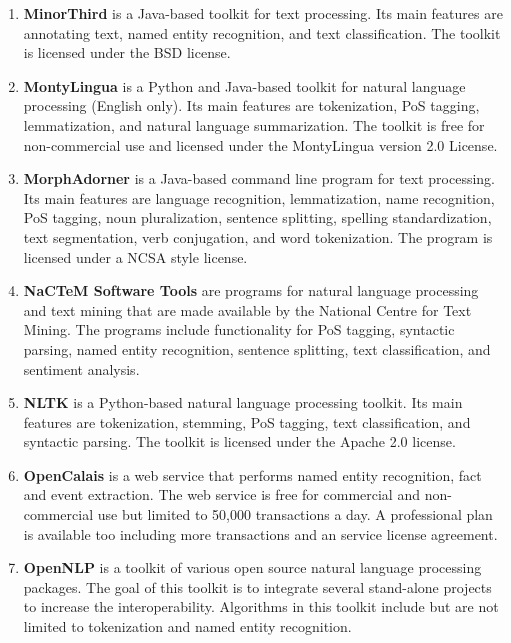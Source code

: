 \begin{enumerate}
	\item \textbf{MinorThird} \cite{cohen2004minorthird} is a Java-based toolkit for text processing. Its main features are annotating text, named entity recognition, and text classification.
The toolkit is licensed under the BSD license.

	\item \textbf{MontyLingua} \cite{liu2004montylingua} is a Python and Java-based toolkit for natural language processing (English only). Its main features are tokenization, PoS tagging, lemmatization, and natural language summarization.
The toolkit is free for non-commercial use and licensed under the MontyLingua version 2.0 License.

	\item \textbf{MorphAdorner} \cite{morphadorner} is a Java-based command line program for text processing. Its main features are language recognition, lemmatization, name recognition, PoS tagging, noun pluralization, sentence splitting, spelling standardization, text segmentation, verb conjugation, and word tokenization.
The program is licensed under a NCSA style license.

	\item \textbf{NaCTeM Software Tools} \cite{nactem} are programs for natural language processing and text mining that are made available by the National Centre for Text Mining. The programs include functionality for PoS tagging, syntactic parsing, named entity recognition, sentence splitting, text classification, and sentiment analysis.

	\item \textbf{NLTK} \cite{loper2002nltk} is a Python-based natural language processing toolkit. Its main features are tokenization, stemming, PoS tagging, text classification, and syntactic parsing.
The toolkit is licensed under the Apache 2.0 license.

	\item \textbf{OpenCalais} \cite{opencalais} is a web service that performs named entity recognition, fact and event extraction.
The web service is free for commercial and non-commercial use but limited to 50,000 transactions a day. A professional plan is available too including more transactions and an service license agreement.

	\item \textbf{OpenNLP} \cite{opennlp} is a toolkit of various open source natural language processing packages. The goal of this toolkit is to integrate several stand-alone projects to increase the interoperability. Algorithms in this toolkit include but are not limited to tokenization and named entity recognition.


\end{enumerate}
